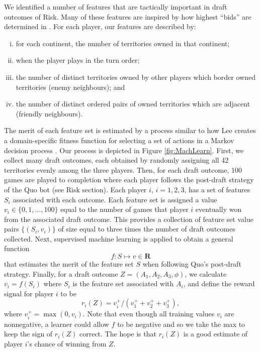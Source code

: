 \documentclass[letterpaper]{article}
\numberwithin{equation}{section}
\numberwithin{theorem}{section}
\numberwithin{lemma}{section}
\numberwithin{df}{section}
\begin{document}
We identified a number of features that are tactically important in draft outcomes of Risk.  Many of these features are inspired by how highest ``bids'' are determined in \cite{RiskBots}.  For each player, our features are described by:
\begin{enumerate}[(i)] %
	\item for each continent, the number of territories owned in that continent;
	\item when the player plays in the turn order;
	\item the number of distinct territories owned by other players which border owned territories (enemy neighbours); and
	\item the number of distinct ordered pairs of owned territories which are adjacent (friendly neighbours).
\end{enumerate}
The merit of each feature set is estimated by a process similar to how Lee creates a domain-specific fitness function for selecting a set of actions in a Markov decision process \cite{GregLeeThesis}.  Our process is depicted in Figure \ref{fig:MachLearn}.  First, we collect many draft outcomes, each obtained by randomly assigning all 42 territories evenly among the three players.  Then, for each draft outcome, 100 games are played to completion where each player follows the post-draft strategy of the Quo bot (see Risk section).  Each player $i$, $i=1,2,3$, has a set of features $S_i$ associated with each outcome.  Each feature set is assigned a value $v_i \in \{0,1,...,100\}$ equal to the number of games that player $i$ eventually won from the associated draft outcome.  This provides a collection of feature set value pairs $\{(S_i, v_i)\}$ of size equal to three times the number of draft outcomes collected.  Next, supervised machine learning is applied to obtain a general function
\[ f: S \mapsto v \in \textbf{R} \] 
that estimates the merit of the feature set $S$ when following Quo's post-draft strategy.  Finally, for a draft outcome $Z = (A_1,A_2,A_3,\phi)$, we calculate $v_i = f(S_i)$ where $S_i$ is the feature set associated with $A_i$, and define the reward signal for player $i$ to be
\[ r_i(Z) = v_i^+ / \left(v_1^+ + v_2^+ + v_3^+\right), \]
where $v_i^+ = \max(0, v_i)$.  Note that even though all training values $v_i$ are nonnegative, a learner could allow $f$ to be negative and so we take the max to keep the sign of $r_i(Z)$ correct.  The hope is that $r_i(Z)$ is a good estimate of player $i$'s chance of winning from $Z$.
\end{document}
